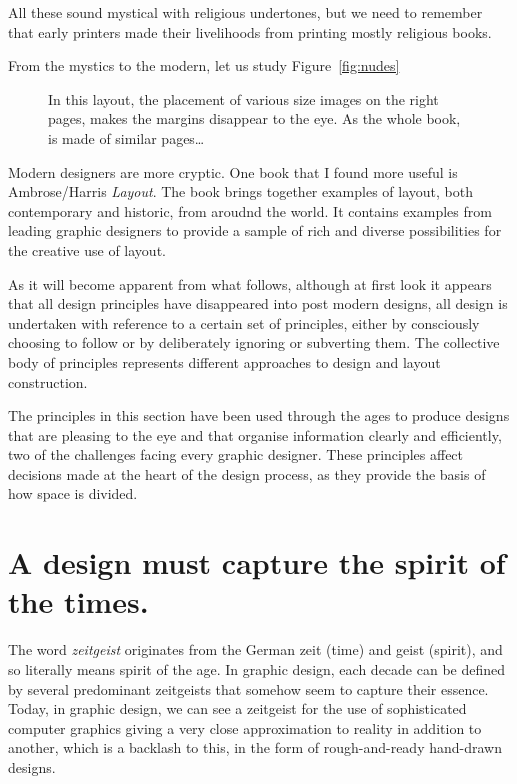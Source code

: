 All these sound mystical with religious undertones, but we need to remember that early printers made their livelihoods from printing mostly religious books.

From the mystics to the modern, let us study Figure~\ref{fig:nudes}

\begin{figure}[htbp]
\centering


\caption{In this layout, the placement of various size images on the right pages, makes the margins disappear to the eye. As the whole book, is made of similar pages\ldots }
\end{figure}

Modern designers are more cryptic. One book that I found more useful is Ambrose/Harris \textit{Layout}. The book brings together examples of layout, both contemporary  and historic, from aroudnd the world. It contains examples from leading graphic designers to provide a sample of rich and diverse possibilities for the creative use of layout.

As it will become apparent from what follows, although at first look it appears that all design principles have disappeared into post modern designs, all design is undertaken with reference to a certain set of principles, either by consciously
choosing to follow or by deliberately ignoring or subverting them. The collective body of principles represents different approaches to design and layout construction.

The principles in this section have been used
through the ages to produce designs that are
pleasing to the eye and that organise information
clearly and efficiently, two of the challenges facing
every graphic designer. These principles affect
decisions made at the heart of the design process,
as they provide the basis of how space is divided.

\section{A design must capture the spirit of the times.}

The word \emph{zeitgeist} originates from the German zeit (time) and geist (spirit),
and so literally means spirit of the age. In graphic design, each decade can
be defined by several predominant zeitgeists that somehow seem to capture
their essence. Today, in graphic design, we can see a zeitgeist for the use of
sophisticated computer graphics giving a very close approximation to reality
in addition to another, which is a backlash to this, in the form of rough-and-ready
hand-drawn designs.

